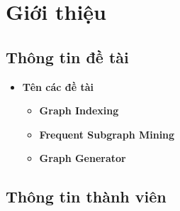 \section{Giới thiệu}
\subsection{Thông tin đề tài}
\begin{itemize}
    \item \textbf{Tên các đề tài}
    \begin{itemize}
        \item \textbf{Graph Indexing}
        \item \textbf{Frequent Subgraph Mining}
        \item \textbf{Graph Generator}
    \end{itemize}
\end{itemize}

\subsection{Thông tin thành viên}

\def\Fjob{3}
\def\Sjob{3}
\def\Tjob{3}

